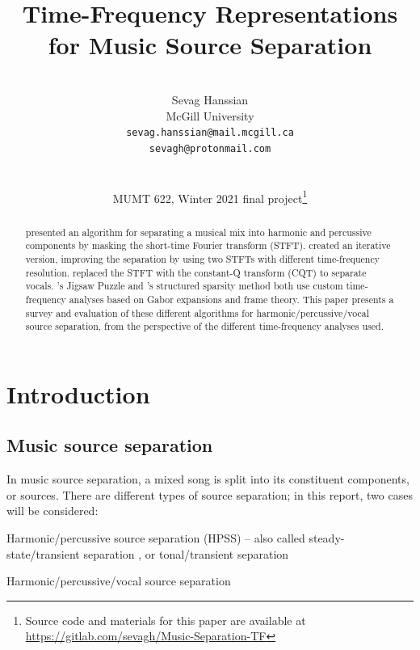 \documentclass[letter,12pt]{article}
\title{Time-Frequency Representations for Music Source Separation}
\author{\vspace{2em}\\Sevag Hanssian \\
  McGill University \\
 \texttt{sevag.hanssian@mail.mcgill.ca} \\
 \texttt{sevagh@protonmail.com} \\\ \\\ \\
 MUMT 622, Winter 2021 final project\thanks{Source code and materials for this paper are available at \url{https://gitlab.com/sevagh/Music-Separation-TF}}}
\date{}
\newenvironment{tight_enumerate}{
\begin{enumerate}
  \setlength{\itemsep}{0pt}
  \setlength{\parskip}{0pt}
}{\end{enumerate}}
\begin{document}
\maketitle

\vfill
\clearpage %

\tableofcontents

\vfill
\clearpage %

\listoffigures

\listoflistings

\vfill
\clearpage %



\begin{abstract}
	\citet{fitzgerald1} presented an algorithm for separating a musical mix into harmonic and percussive components by masking the short-time Fourier transform (STFT). \citet{driedger} created an iterative version, improving the separation by using two STFTs with different time-frequency resolution. \citet{fitzgerald2} replaced the STFT with the constant-Q transform (CQT) to separate vocals. \citet{tfjigsaw}'s Jigsaw Puzzle and \citet{wmdct}'s structured sparsity method both use custom time-frequency analyses based on Gabor expansions and frame theory. This paper presents a survey and evaluation of these different algorithms for harmonic/percussive/vocal source separation, from the perspective of the different time-frequency analyses used.
\end{abstract}

\section{Introduction}
\label{sec:intro}

\subsection{Music source separation}

In music source separation, a mixed song is split into its constituent components, or sources. There are different types of source separation; in this report, two cases will be considered:

\begin{tight_enumerate}
	\item
		Harmonic/percussive source separation (HPSS) -- also called steady-state/transient separation \cite{bayarres}, or tonal/transient separation \cite{tfjigsaw, wmdct}
	\item
		Harmonic/percussive/vocal source separation
\end{tight_enumerate}
\end{document}
